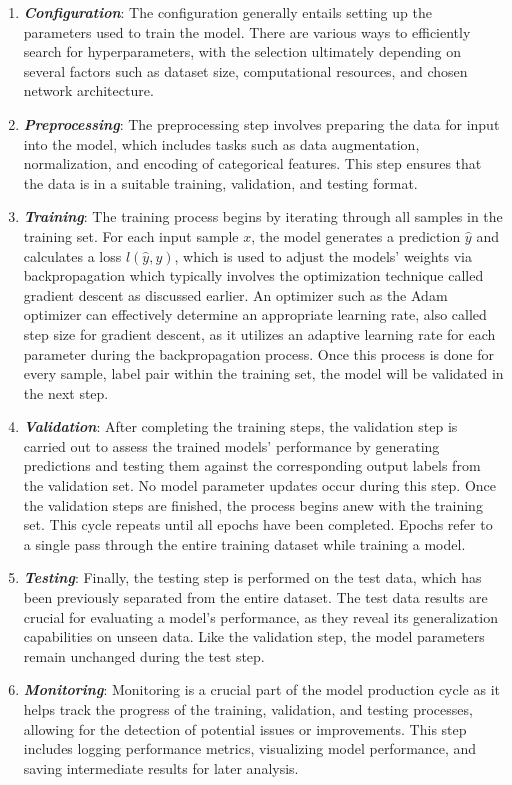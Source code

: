 \begin{enumerate}
    \item \textbf{\emph{Configuration}}: The configuration generally entails setting up the parameters used to train the model. There are various ways to efficiently search for hyperparameters, with the selection ultimately depending on several factors such as dataset size, computational resources, and chosen network architecture.
    \item \textbf{\emph{Preprocessing}}: The preprocessing step involves preparing the data for input into the model, which includes tasks such as data augmentation, normalization, and encoding of categorical features. This step ensures that the data is in a suitable training, validation, and testing format.
    \item \textbf{\emph{Training}}: The training process begins by iterating through all samples in the training set. For each input sample $x$, the model generates a prediction $\hat{y}$ and calculates a loss $l(\hat{y},y)$, which is used to adjust the models' weights via backpropagation which typically involves the optimization technique called gradient descent as discussed earlier. An optimizer such as the Adam optimizer can effectively determine an appropriate learning rate, also called step size for gradient descent, as it utilizes an adaptive learning rate for each parameter during the backpropagation process. Once this process is done for every sample, label pair within the training set, the model will be validated in the next step.
    \item \textbf{\emph{Validation}}: After completing the training steps, the validation step is carried out to assess the trained models' performance by generating predictions and testing them against the corresponding output labels from the validation set. No model parameter updates occur during this step. Once the validation steps are finished, the process begins anew with the training set. This cycle repeats until all epochs have been completed. Epochs refer to a single pass through the entire training dataset while training a model.
    \item \textbf{\emph{Testing}}: Finally, the testing step is performed on the test data, which has been previously separated from the entire dataset. The test data results are crucial for evaluating a model's performance, as they reveal its generalization capabilities on unseen data. Like the validation step, the model parameters remain unchanged during the test step.
    \item \textbf{\emph{Monitoring}}: Monitoring is a crucial part of the model production cycle as it helps track the progress of the training, validation, and testing processes, allowing for the detection of potential issues or improvements. This step includes logging performance metrics, visualizing model performance, and saving intermediate results for later analysis.
\end{enumerate}
